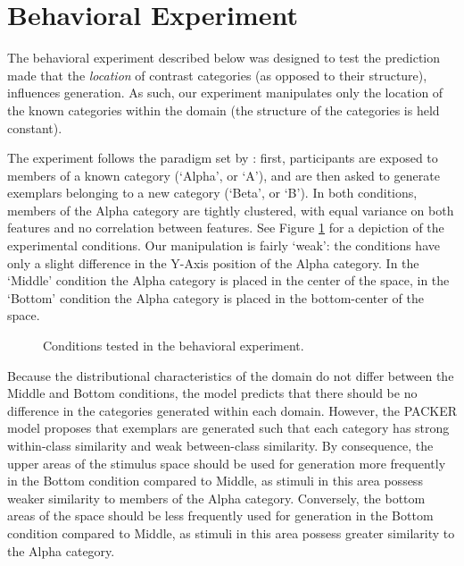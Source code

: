 \documentclass[10pt,letterpaper]{article}
\begin{document}
\section{Behavioral Experiment}

The behavioral experiment described below was designed to test the prediction made that the \textit{location} of contrast categories (as opposed to their structure), influences generation. As such, our experiment manipulates only the location of the known categories within the domain (the structure of the categories is held constant). 

The experiment follows the paradigm set by \citet{jern2013probabilistic}: first, participants are exposed to members of a known category (`Alpha', or `A'), and are then asked to generate exemplars belonging to a new category (`Beta', or `B'). In both conditions, members of the Alpha category are tightly clustered, with equal variance on both features and no correlation between features. See Figure \ref{fig:middle-bottom-conditions} for a depiction of the experimental conditions. Our manipulation is fairly `weak': the conditions have only a slight difference in the Y-Axis position of the Alpha category. In the `Middle' condition the Alpha category is placed in the center of the space, in the `Bottom' condition the Alpha category is placed in the bottom-center of the space. 


\begin{figure}
    \begin{center}
    
    \caption{Conditions tested in the behavioral experiment.}
    \label{fig:middle-bottom-conditions}
    \end{center}
\end{figure}

Because the distributional characteristics of the domain do not differ between the Middle and Bottom conditions, the \citet{jern2013probabilistic} model predicts that there should be no difference in the categories generated within each domain. However, the PACKER model proposes that exemplars are generated such that each category has strong within-class similarity and weak between-class similarity. By consequence, the upper areas of the stimulus space should be used for generation more frequently in the Bottom condition compared to Middle, as stimuli in this area possess weaker similarity to members of the Alpha category. Conversely, the bottom areas of the space should be less frequently used for generation in the Bottom condition compared to Middle, as stimuli in this area possess greater similarity to the Alpha category.
\end{document}
